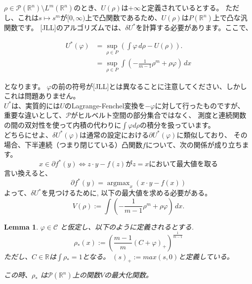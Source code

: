 \documentclass{jsarticle}
\newtheorem{lem}[thm]{Lemma}
\theoremstyle{definition}
\begin{document}
$\rho \in \mathcal{P}(\mathbb{R}^n) \setminus L^m(\mathbb{R}^n)$のとき、$U(\rho)$は$+\infty$と定義されているとする。
ただし、これは$s \mapsto s^m$が$[0, \infty)$上で凸関数であるため、$U(\rho)$は$P(\mathbb{R}^n)$上で凸な汎関数です。
[JLL]のアルゴリズムでは、$\delta U^*$を計算する必要があります。ここで、

\begin{align*}
  U^*(\varphi) &= \sup_{\rho \in P} \left( \int \varphi \, d\rho - U(\rho) \right).\\
               &= \sup_{\rho \in P} \int \left(- \frac{1}{m-1}\rho^m + \rho\varphi\right) \, dx
\end{align*}

となります。
$\varphi$の前の符号が[JLL]とは異なることに注意してください、しかしこれは問題ありません。\\

$U^*$は、実質的には$U$のLagrange-Fenchel変換を$-\varphi$に対して行ったものですが、
重要な違いとして、$\mathcal{P}$がヒルベルト空間の部分集合ではなく、
測度と連続関数の間の双対性を使って内積の代わりに$\int \varphi d \rho$の積分を扱っています。\\

{\color{teal}
どちらにせよ、$\delta U^*(\varphi)$は通常の設定における$\partial U^*(\varphi)$に類似しており、
その場合、下半連続（つまり閉じている）凸関数$f$について、次の関係が成り立ちます。}
\[
  x \in \partial f^*(y) \iff z \cdot y - f(z) \text{が} z = x \text{において最大値を取る}
\]
言い換えると、
\[
  \partial f^*(y) = \operatorname{argmax}_x (x \cdot y - f(x))
\]
{\color{teal}
よって、$\delta U^*$を見つけるために, 以下の最大値を求める必要がある。
\[
  V(\rho) := \int \left(- \frac{1}{m-1}\rho^m + \rho\varphi\right) \, dx.
\]
}
\vspace\baselineskip 

\begin{lem}
  $\varphi \in \mathcal{C}$ と仮定し、以下のように定義されるとする.
  $$
    \rho_*(x) := \left( \frac{m-1}{m}(C + \varphi)_+ \right)^{\frac{1}{m-1}} 
  $$
  ただし、$C \in \mathbb{R}$は$\int \rho_* = 1$となる。
  $(s)_+ := max(s, 0)$と定義している。

  この時、$\rho_*$ は$\mathcal{P}(\mathbb{R}^n)$上の関数$V$の最大化関数。
\end{lem}
\end{document}
